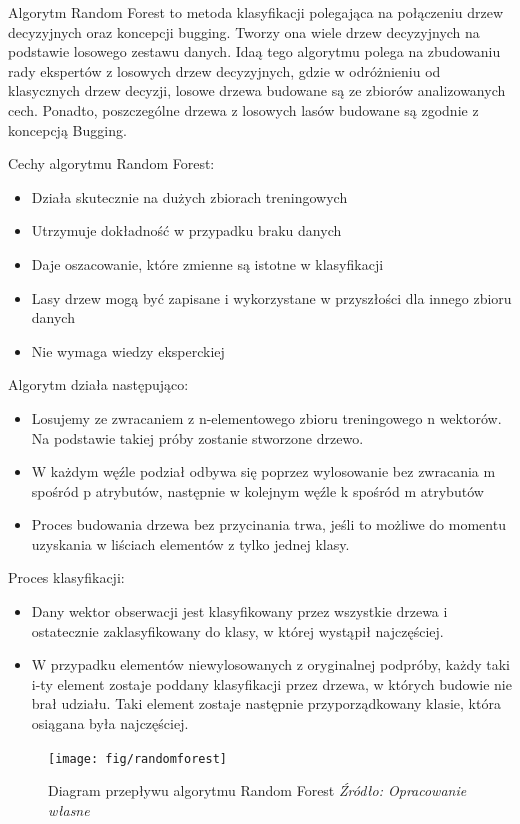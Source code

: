 \documentclass[brudnopis]{xmgr}
\begin{document}
Algorytm Random Forest\cite{3}\cite{13} to metoda klasyfikacji polegająca na połączeniu drzew decyzyjnych oraz koncepcji bugging. Tworzy ona wiele drzew decyzyjnych na podstawie losowego zestawu danych. Idaą tego algorytmu polega na zbudowaniu rady ekspertów z losowych drzew decyzyjnych, gdzie w odróżnieniu od klasycznych drzew decyzji, losowe drzewa budowane są ze zbiorów analizowanych cech. Ponadto, poszczególne drzewa z losowych lasów budowane są zgodnie z koncepcją Bugging.

Cechy algorytmu Random Forest:
\begin{itemize}
\item
Działa skutecznie na dużych zbiorach treningowych
\item
Utrzymuje dokładność w przypadku braku danych
\item
Daje oszacowanie, które zmienne są istotne w klasyfikacji
\item
Lasy drzew mogą być zapisane i wykorzystane w przyszłości dla innego zbioru danych
\item
Nie wymaga wiedzy eksperckiej
\end{itemize}

Algorytm działa następująco:
\begin{itemize}
\item
Losujemy ze zwracaniem z n-elementowego zbioru treningowego n wektorów. Na podstawie takiej próby zostanie stworzone drzewo.
\item
W każdym węźle podział odbywa się poprzez wylosowanie bez zwracania m spośród p atrybutów, następnie w kolejnym węźle k spośród m atrybutów
\item
Proces budowania drzewa bez przycinania trwa, jeśli to możliwe do momentu uzyskania w liściach elementów z tylko jednej klasy.
\end{itemize}
\newpage

Proces klasyfikacji:
\begin{itemize}
\item
Dany wektor obserwacji jest klasyfikowany przez wszystkie drzewa i ostatecznie zaklasyfikowany do klasy, w której wystąpił najczęściej.
\item
W przypadku elementów niewylosowanych z oryginalnej podpróby, każdy taki i-ty element zostaje poddany klasyfikacji przez drzewa, w których budowie nie brał udziału. Taki element zostaje następnie przyporządkowany klasie, która osiągana była najczęściej.
\end{itemize}

\begin{figure}[!tbh]
\centering
\texttt{[image: fig/randomforest]}
\caption{Diagram przepływu algorytmu Random Forest \emph{Źródło: Opracowanie własne}}
\end{figure}
\newpage
\end{document}

